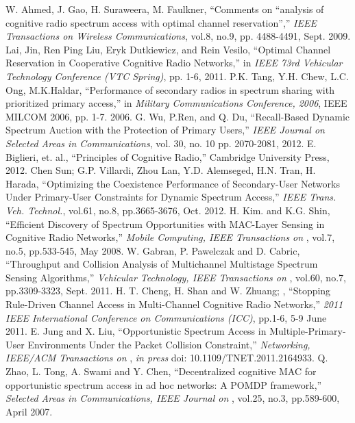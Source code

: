 \begin{thebibliography}{}
 W. Ahmed, J. Gao, H. Suraweera, M. Faulkner, ``Comments on ``analysis of cognitive radio spectrum access with optimal channel reservation'','' \emph{IEEE Transactions on Wireless Communications}, vol.8, no.9, pp. 4488-4491, Sept. 2009.
 Lai, Jin, Ren Ping Liu, Eryk Dutkiewicz, and Rein Vesilo, ``Optimal Channel Reservation in Cooperative Cognitive Radio Networks,'' in \emph{IEEE 73rd Vehicular Technology Conference (VTC Spring)}, pp. 1-6, 2011.
 P.K. Tang, Y.H. Chew, L.C. Ong, M.K.Haldar, ``Performance of secondary radios in spectrum sharing with prioritized primary access,'' in \emph{Military Communications Conference, 2006}, IEEE MILCOM 2006, pp. 1-7. 2006.
 G. Wu, P.Ren, and Q. Du, ``Recall-Based Dynamic Spectrum Auction with the Protection of Primary Users,'' \emph{IEEE Journal on Selected Areas in Communications}, vol. 30, no. 10 pp. 2070-2081, 2012.
 E. Biglieri, et. al., ``Principles of Cognitive Radio,'' Cambridge University Press, 2012.
 Chen Sun; G.P. Villardi, Zhou Lan, Y.D. Alemseged, H.N. Tran, H. Harada,  ``Optimizing the Coexistence Performance of Secondary-User Networks Under Primary-User Constraints for Dynamic Spectrum Access,''\emph{ IEEE Trans. Veh. Technol.}, vol.61, no.8, pp.3665-3676, Oct. 2012.
 H. Kim. and K.G. Shin, ``Efficient Discovery of Spectrum Opportunities with MAC-Layer Sensing in Cognitive Radio Networks,'' \emph{Mobile Computing, IEEE Transactions on }, vol.7, no.5, pp.533-545, May 2008.
 W. Gabran, P. Pawelczak and D. Cabric, ``Throughput and Collision Analysis of Multichannel Multistage Spectrum Sensing Algorithms,'' \emph{Vehicular Technology, IEEE Transactions on }, vol.60, no.7, pp.3309-3323, Sept. 2011.
 H. T. Cheng, H. Shan and W. Zhuang; , ``Stopping Rule-Driven Channel Access in Multi-Channel Cognitive Radio Networks,'' \emph{2011 IEEE International Conference on Communications (ICC)}, pp.1-6, 5-9 June 2011.
 E. Jung and X. Liu, ``Opportunistic Spectrum Access in Multiple-Primary-User Environments Under the Packet Collision Constraint,'' \emph{Networking, IEEE/ACM Transactions on }, \textit{in press} doi: 10.1109/TNET.2011.2164933.
 Q. Zhao, L. Tong, A. Swami and Y. Chen, ``Decentralized cognitive MAC for opportunistic spectrum access in ad hoc networks: A POMDP framework,'' \emph{Selected Areas in Communications, IEEE Journal on }, vol.25, no.3, pp.589-600, April 2007.

\end{thebibliography}
